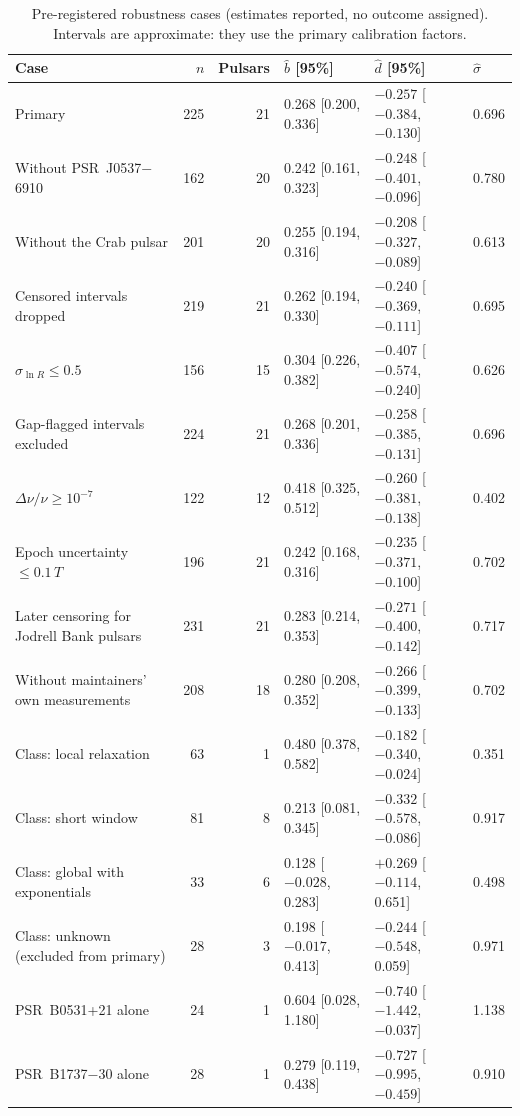 \documentclass[fleqn,usenatbib]{mnras}
\newcommand{\dnu}{\Delta\nu/\nu}
\newcommand{\bhat}{\hat b}
\newcommand{\dhat}{\hat d}
\newcommand{\shat}{\hat\sigma}
\newcommand{\psr}[1]{PSR~#1}
\begin{document}
\begin{table}
\centering
\caption{Pre-registered robustness cases (estimates reported, no outcome
assigned). Intervals are approximate: they use the primary calibration
factors.}
\label{tab:robust}
\small
\begin{tabular}{@{}lrrlll@{}}
\toprule
Case & $n$ & Pulsars & $\bhat$ [95\%] & $\dhat$ [95\%] & $\shat$\\
\midrule
Primary & 225 & 21 & 0.268 [0.200, 0.336] & $-0.257$ [$-0.384$, $-0.130$] & 0.696\\
Without \psr{J0537$-$6910} & 162 & 20 & 0.242 [0.161, 0.323] & $-0.248$ [$-0.401$, $-0.096$] & 0.780\\
Without the Crab pulsar & 201 & 20 & 0.255 [0.194, 0.316] & $-0.208$ [$-0.327$, $-0.089$] & 0.613\\
Censored intervals dropped & 219 & 21 & 0.262 [0.194, 0.330] & $-0.240$ [$-0.369$, $-0.111$] & 0.695\\
$\sigma_{\ln R}\leq0.5$ & 156 & 15 & 0.304 [0.226, 0.382] & $-0.407$ [$-0.574$, $-0.240$] & 0.626\\
Gap-flagged intervals excluded & 224 & 21 & 0.268 [0.201, 0.336] & $-0.258$ [$-0.385$, $-0.131$] & 0.696\\
$\dnu\geq10^{-7}$ & 122 & 12 & 0.418 [0.325, 0.512] & $-0.260$ [$-0.381$, $-0.138$] & 0.402\\
Epoch uncertainty $\leq0.1\,T$ & 196 & 21 & 0.242 [0.168, 0.316] & $-0.235$ [$-0.371$, $-0.100$] & 0.702\\
Later censoring for Jodrell Bank pulsars & 231 & 21 & 0.283 [0.214, 0.353] & $-0.271$ [$-0.400$, $-0.142$] & 0.717\\
Without maintainers' own measurements & 208 & 18 & 0.280 [0.208, 0.352] & $-0.266$ [$-0.399$, $-0.133$] & 0.702\\
\midrule
Class: local relaxation & 63 & 1 & 0.480 [0.378, 0.582] & $-0.182$ [$-0.340$, $-0.024$] & 0.351\\
Class: short window & 81 & 8 & 0.213 [0.081, 0.345] & $-0.332$ [$-0.578$, $-0.086$] & 0.917\\
Class: global with exponentials & 33 & 6 & 0.128 [$-0.028$, 0.283] & $+0.269$ [$-0.114$, 0.651] & 0.498\\
Class: unknown (excluded from primary) & 28 & 3 & 0.198 [$-0.017$, 0.413] & $-0.244$ [$-0.548$, 0.059] & 0.971\\
\midrule
\psr{B0531+21} alone & 24 & 1 & 0.604 [0.028, 1.180] & $-0.740$ [$-1.442$, $-0.037$] & 1.138\\
\psr{B1737$-$30} alone & 28 & 1 & 0.279 [0.119, 0.438] & $-0.727$ [$-0.995$, $-0.459$] & 0.910\\

\end{tabular}
\end{table}
\end{document}
